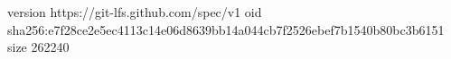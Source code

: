 version https://git-lfs.github.com/spec/v1
oid sha256:e7f28ce2e5ec4113c14e06d8639bb14a044cb7f2526ebef7b1540b80bc3b6151
size 262240
